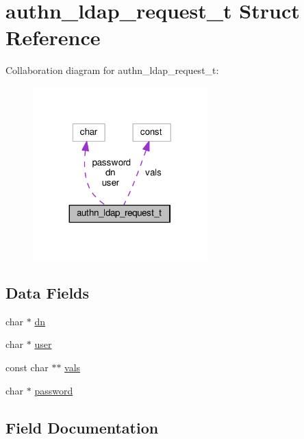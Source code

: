 \hypertarget{structauthn__ldap__request__t}{}\section{authn\+\_\+ldap\+\_\+request\+\_\+t Struct Reference}
\label{structauthn__ldap__request__t}


Collaboration diagram for authn\+\_\+ldap\+\_\+request\+\_\+t\+:
\nopagebreak
\begin{figure}[H]
\begin{center}
\leavevmode
\includegraphics[width=191pt]{structauthn__ldap__request__t__coll__graph}
\end{center}
\end{figure}
\subsection*{Data Fields}
\begin{DoxyCompactItemize}
\item 
char $\ast$ \hyperlink{structauthn__ldap__request__t_a4b32a7f97f77301b77ad54c9c4ab92c1}{dn}
\item 
char $\ast$ \hyperlink{structauthn__ldap__request__t_ae5d1599488d3385e3fe9ec646ae2fee1}{user}
\item 
const char $\ast$$\ast$ \hyperlink{structauthn__ldap__request__t_a51d703e0a5d34b0b31e20411c1ecf7d7}{vals}
\item 
char $\ast$ \hyperlink{structauthn__ldap__request__t_ab2c9b31b2990c7e13cc9b648e707c7f4}{password}
\end{DoxyCompactItemize}


\subsection{Field Documentation}
